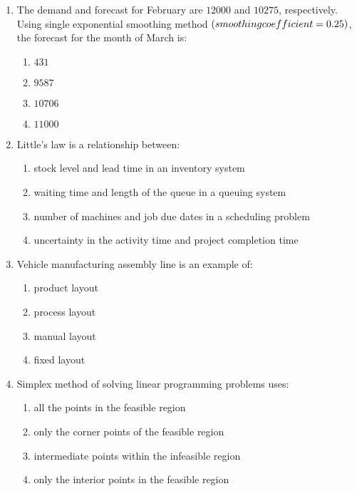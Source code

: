 \documentclass[journal,12pt,twocolumn]{IEEEtran}
\theoremstyle{remark}
\begin{document}
\begin{enumerate}[start=14]
    \item The demand and forecast for February are $12000$ and $10275$, respectively. Using single exponential smoothing method $\left(smoothing coefficient = 0.25\right)$, the forecast for the month of March is:
    \begin{enumerate}
        \item $431$
        \item $9587$
        \item $10706$
        \item $11000$
    \end{enumerate}

    \item Little's law is a relationship between:
    \begin{enumerate}
        \item stock level and lead time in an inventory system
        \item waiting time and length of the queue in a queuing system
        \item number of machines and job due dates in a scheduling problem
        \item uncertainty in the activity time and project completion time
    \end{enumerate}

    \item Vehicle manufacturing assembly line is an example of:
    \begin{enumerate}
        \item product layout
        \item process layout
        \item manual layout
        \item fixed layout
    \end{enumerate}

    \item Simplex method of solving linear programming problems uses:
    \begin{enumerate}
        \item all the points in the feasible region
        \item only the corner points of the feasible region
        \item intermediate points within the infeasible region
        \item only the interior points in the feasible region
    \end{enumerate}


\end{enumerate}
\end{document}
